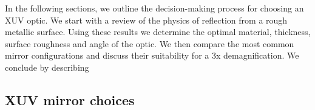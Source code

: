 In the following sections, we outline the decision-making process for choosing an XUV optic. We start with a review of the physics of reflection from a rough metallic surface. Using these results we determine the optimal material, thickness, surface roughness and angle of the optic. We then compare the most common mirror configurations and discuss their suitability for a 3x demagnification. We conclude by describing 



\subsection{XUV mirror choices}


